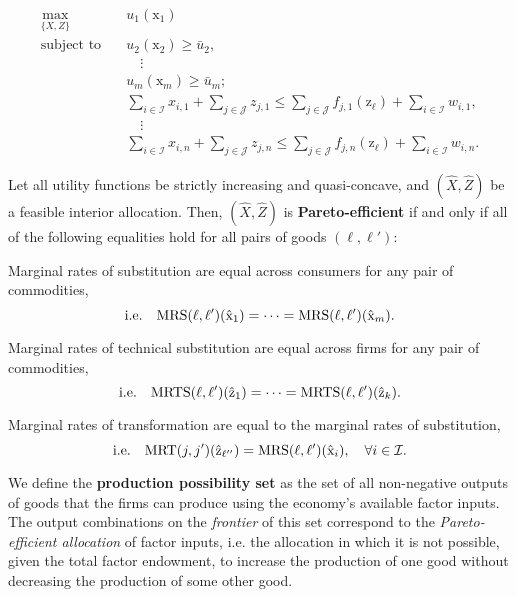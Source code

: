 \documentclass[8pt,a4paper]{extarticle}
\begin{document}
\begin{multicols}{3}
  \begin{equation*}
    \begin{aligned}
      \max_{\{X,Z\}} \quad    & u_1(\mathrm{x}_1) \\
      \text{subject to} \quad & u_2(\mathrm{x}_2) \geq \bar{u}_2, \\
                              & \quad \vdots \\
                              & u_m(\mathrm{x}_m) \geq \bar{u}_m; \\
                              & \sum_{i \in \mathcal{I}} x_{i,1} + \sum_{j \in \mathcal{J}} z_{j,1} \leq \sum_{j \in \mathcal{J}} f_{j,1} (\mathrm{z}_\ell) + \sum_{i \in \mathcal{I}} w_{i,1}, \\
                              & \quad \vdots \\
                              & \sum_{i \in \mathcal{I}} x_{i,n} + \sum_{j \in \mathcal{J}} z_{j,n} \leq \sum_{j \in \mathcal{J}} f_{j,n} (\mathrm{z}_\ell) + \sum_{i \in \mathcal{I}} w_{i,n}.
    \end{aligned}
  \end{equation*}

  \begin{boxtheo}
    Let all utility functions be strictly increasing and quasi-concave, and $(\hat{X},\hat{Z})$ be a feasible interior allocation. Then, $(\hat{X},\hat{Z})$ is \textbf{Pareto-efficient} if and only if all of the following equalities hold for all pairs of goods $(\ell,\ell')$:
    \begin{eqlist}
      \item Marginal rates of substitution are equal across consumers for any pair of commodities, \[\text{\normalfont i.e.} \quad \text{\normalfont MRS}(\ell,\ell')(\hat{\mathrm{x}}_1) = \cdots = \text{\normalfont MRS}(\ell,\ell')(\hat{\mathrm{x}}_m).\]
      \item Marginal rates of technical substitution are equal across firms for any pair of commodities, \[\text{\normalfont i.e.} \quad \text{\normalfont MRTS}(\ell,\ell')(\hat{\mathrm{z}}_1) = \cdots = \text{\normalfont MRTS}(\ell,\ell')(\hat{\mathrm{z}}_k).\]
      \item Marginal rates of transformation are equal to the marginal rates of substitution, \[\text{\normalfont i.e.} \quad \text{\normalfont MRT}(j,j')(\hat{\mathrm{z}}_{\ell''}) = \text{\normalfont MRS}(\ell,\ell')(\hat{\mathrm{x}}_i), \quad \forall i \in \mathcal{I}.\]
    \end{eqlist}
  \end{boxtheo}

  \begin{boxdef}
    We define the \textbf{production possibility set} as the set of all non-negative outputs of goods that the firms can produce using the economy's available factor inputs. The output combinations on the \emph{frontier} of this set correspond to the \emph{Pareto-efficient allocation} of factor inputs, i.e. the allocation in which it is not possible, given the total factor endowment, to increase the production of one good without decreasing the production of some other good.
  \end{boxdef}


\end{multicols}
\end{document}
